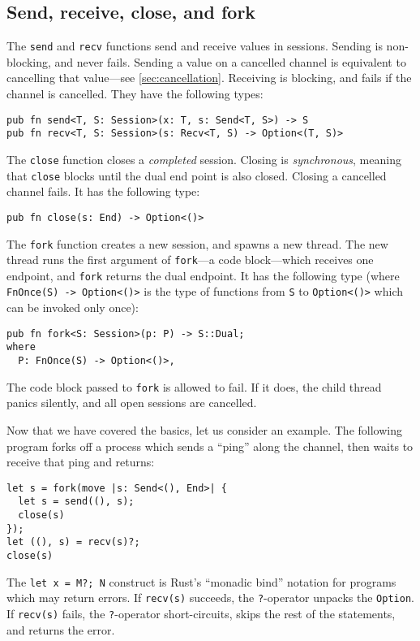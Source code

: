 \documentclass[sigconf,natbib=false]{acmart}
\begin{document}
\subsection{Send, receive, close, and fork}\label{sec:basics}
The \lstinline{send} and \lstinline{recv} functions send and receive values in sessions. Sending is non-blocking, and never fails. Sending a value on a cancelled channel is equivalent to cancelling that value---see \cref{sec:cancellation}. Receiving is blocking, and fails if the channel is cancelled. They have the following types:
\begin{lstlisting}
pub fn send<T, S: Session>(x: T, s: Send<T, S>) -> S
pub fn recv<T, S: Session>(s: Recv<T, S) -> Option<(T, S)>
\end{lstlisting}
The \lstinline{close} function closes a \emph{completed} session. Closing is \emph{synchronous}, meaning that \lstinline{close} blocks until the dual end point is also closed. Closing a cancelled channel fails. It has the following type:
\begin{lstlisting}
pub fn close(s: End) -> Option<()>
\end{lstlisting}
The \lstinline{fork} function creates a new session, and spawns a new thread. The new thread runs the first argument of \lstinline{fork}---a code block---which receives one endpoint, and \lstinline{fork} returns the dual endpoint. It has the following type (where \lstinline{FnOnce(S) -> Option<()>} is the type of functions from \lstinline{S} to \lstinline{Option<()>} which can be invoked only once):
\begin{lstlisting}
pub fn fork<S: Session>(p: P) -> S::Dual;
where
  P: FnOnce(S) -> Option<()>,
\end{lstlisting}
The code block passed to \lstinline{fork} is allowed to fail. If it does, the child thread panics silently, and all open sessions are cancelled.

Now that we have covered the basics, let us consider an example. The following program forks off a process which sends a ``ping'' along the channel, then waits to receive that ping and returns:
\begin{lstlisting}
let s = fork(move |s: Send<(), End>| {
  let s = send((), s);
  close(s)
});
let ((), s) = recv(s)?;
close(s)
\end{lstlisting}
The \lstinline{let x = M?; N} construct is Rust's ``monadic bind'' notation for programs which may return errors. If \lstinline{recv(s)} succeeds, the \lstinline{?}-operator unpacks the \lstinline{Option}. If \lstinline{recv(s)} fails, the \lstinline{?}-operator short-circuits, skips the rest of the statements, and returns the error.
\end{document}

